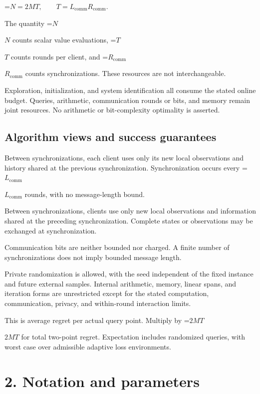 \documentclass[10pt,a4paper]{article}
\newcommand{\AtlasMath}[1]{\par\begingroup\centering\setbox0=\hbox{$\displaystyle #1$}\ifdim\wd0>1.4\linewidth\typeout{ATLAS WIDE FORMULA: \the\wd0}\fi\ifdim\wd0>\linewidth\resizebox{\linewidth}{!}{\box0}\else\box0\fi\par\endgroup}
\newcommand{\AtlasInlineMath}[1]{\begingroup\setbox0=\hbox{$#1$}\ifdim\wd0>.4\linewidth\endgroup\AtlasMath{#1}\else\endgroup$#1$\fi}
\begin{document}
\AtlasMath{N=2MT,\qquad T=L_{\mathrm{comm}}R_{\mathrm{comm}}.}




The quantity \AtlasInlineMath{N} counts scalar value evaluations, \AtlasInlineMath{T} counts rounds per client, and \AtlasInlineMath{R_{\mathrm{comm}}} counts synchronizations. These resources are not interchangeable.



Exploration, initialization, and system identification all consume the stated online budget. Queries, arithmetic, communication rounds or bits, and memory remain joint resources. No arithmetic or bit-complexity optimality is asserted.



\subsection{Algorithm views and success guarantees}


Between synchronizations, each client uses only its new local observations and history shared at the previous synchronization. Synchronization occurs every \AtlasInlineMath{L_{\mathrm{comm}}} rounds, with no message-length bound.



Between synchronizations, clients use only new local observations and information shared at the preceding synchronization. Complete states or observations may be exchanged at synchronization.



Communication bits are neither bounded nor charged. A finite number of synchronizations does not imply bounded message length.



Private randomization is allowed, with the seed independent of the fixed instance and future external samples. Internal arithmetic, memory, linear spans, and iteration forms are unrestricted except for the stated computation, communication, privacy, and within-round interaction limits.



This is average regret per actual query point. Multiply by \AtlasInlineMath{2MT} for total two-point regret. Expectation includes randomized queries, with worst case over admissible adaptive loss environments.



\section{2. Notation and parameters}
\end{document}
